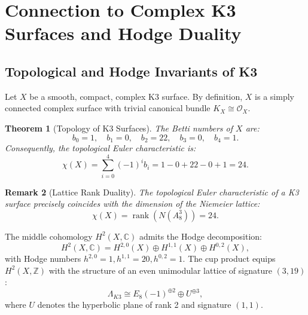 \documentclass[11pt,a4paper]{article}
\newtheorem{theorem}{Theorem}
\newtheorem{remark}[theorem]{Remark}
\begin{document}
\section{Connection to Complex K3 Surfaces and Hodge Duality}

\subsection{Topological and Hodge Invariants of K3}
Let $X$ be a smooth, compact, complex K3 surface. By definition, $X$ is a simply connected complex surface with trivial canonical bundle $K_X \cong \mathcal{O}_X$.

\begin{theorem}[Topology of K3 Surfaces]
The Betti numbers of $X$ are:
\begin{equation}
b_0 = 1, \quad b_1 = 0, \quad b_2 = 22, \quad b_3 = 0, \quad b_4 = 1.
\end{equation}
Consequently, the topological Euler characteristic is:
\begin{equation}
\chi(X) = \sum_{i=0}^4 (-1)^i b_i = 1 - 0 + 22 - 0 + 1 = 24.
\end{equation}
\end{theorem}

\begin{remark}[Lattice Rank Duality]
The topological Euler characteristic of a K3 surface precisely coincides with the dimension of the Niemeier lattice:
\begin{equation}
\chi(X) = \operatorname{rank}(N(A_8^3)) = 24.
\end{equation}
\end{remark}

The middle cohomology $H^2(X, \mathbb{C})$ admits the Hodge decomposition:
\begin{equation}
H^2(X, \mathbb{C}) = H^{2,0}(X) \oplus H^{1,1}(X) \oplus H^{0,2}(X),
\end{equation}
with Hodge numbers $h^{2,0} = 1, h^{1,1} = 20, h^{0,2} = 1$. The cup product equips $H^2(X, \mathbb{Z})$ with the structure of an even unimodular lattice of signature $(3, 19)$:
\begin{equation}
\Lambda_{K3} \cong E_8(-1)^{\oplus 2} \oplus U^{\oplus 3},
\end{equation}
where $U$ denotes the hyperbolic plane of rank 2 and signature $(1, 1)$.
\end{document}
